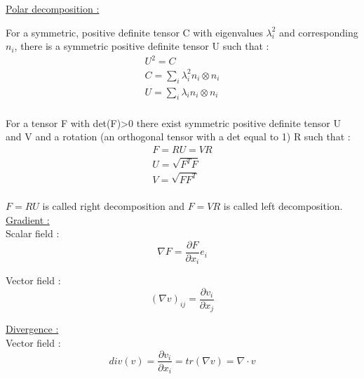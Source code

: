 \documentclass[../main.tex]{subfiles}
\begin{document}
\quad \underline{Polar decomposition :}\\

\begin{theoremen}
    For a symmetric, positive definite tensor C with eigenvalues $\lambda_i^2$ and corresponding $n_i$, there is a symmetric positive definite tensor U such that : \begin{equation}
        \begin{gathered}
            U^2 = C\\
            C = \sum_i \lambda_i^2 n_i \otimes n_i\\
            U = \sum_i \lambda_i n_i \otimes n_i\\
        \end{gathered}
    \end{equation}
\end{theoremen}

\begin{theoremen}
    For a tensor F with det(F)>0 there exist symmetric positive definite tensor U and V and a rotation (an orthogonal tensor with a det equal to 1) R such that : \begin{equation} \begin{gathered}
        F = RU = VR\\
        U = \sqrt{F^TF}\\
        V = \sqrt{F F^T}\\
        \end{gathered}
    \end{equation}
\end{theoremen}

$F = RU$ is called right decomposition and $F = VR$ is called left decomposition.\\

\quad \underline{Gradient :}\\

Scalar field :
\begin{equation}
    \nabla F = \frac{\partial F}{\partial x_i} e_i
\end{equation}

Vector field :
\begin{equation}
    (\nabla v)_{ij} = \frac{\partial v_i}{\partial x_j}
\end{equation}

\quad \underline{Divergence :}\\
Vector field :
\begin{equation}
    div(v) = \frac{\partial v_i}{\partial x_i} = tr(\nabla v) = \nabla \cdot v
\end{equation}
\end{document}
